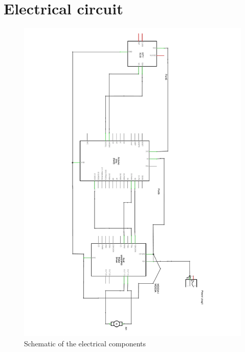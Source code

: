 \documentclass[a4paper,11pt]{kth-mag}
\begin{document}
\section{Electrical circuit}
\label{app: electrical circuit}
\begin{figure}[!htb]
\centering
\includegraphics[scale=0.4]{total_schem.pdf}
\caption{Schematic of the electrical components}
\label{Fig: circuit}
\end{figure}


\cleardoublepage   
\cleartoverso %


\end{document}
